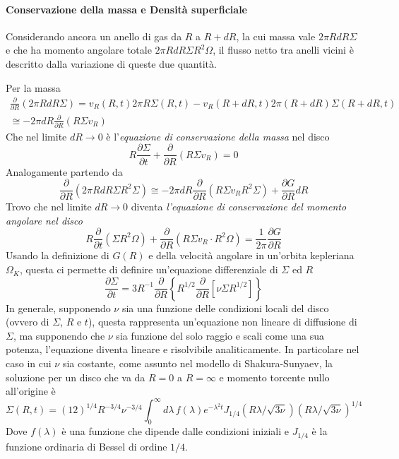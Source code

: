 \documentclass[a4paperbi]{article}
\begin{document}
	\paragraph{Conservazione della massa e Densità superficiale}
	Considerando ancora un anello di gas da $R$ a $R+dR$, la cui massa vale $2\pi RdR\Sigma$ e che ha momento angolare totale $2\pi RdR\Sigma R^2\Omega$, il flusso netto tra anelli vicini è descritto dalla variazione di queste due quantità. 
	
	Per la massa
	\begin{gather*}
		\frac{\partial}{\partial R}(2\pi RdR\Sigma)=v_R(R,t)2\pi R\Sigma(R,t)-v_R(R+dR,t)2\pi(R+dR)\Sigma(R+dR,t)\\
		\cong-2\pi dR\frac{\partial}{\partial R}(R\Sigma v_R)
	\end{gather*}
	Che nel limite $dR\rightarrow 0$ è l'\textit{equazione di conservazione della massa} nel disco
	\begin{equation}
		R\frac{\partial\Sigma}{\partial t}+\frac{\partial}{\partial R}(R\Sigma v_R)=0
	\end{equation}
	Analogamente partendo da
	\begin{equation*}
		\frac{\partial}{\partial R}(2\pi RdR\Sigma R^2\Sigma)\cong-2\pi dR\frac{\partial}{\partial R}(R\Sigma v_R R^2\Sigma)+\frac{\partial G}{\partial R}dR	
	\end{equation*}
	Trovo che nel limite $dR\rightarrow 0$ diventa \textit{l'equazione di conservazione del momento angolare nel disco}
	\begin{equation}
		R\frac{\partial}{\partial t}(\Sigma R^2\Omega)+\frac{\partial}{\partial R}(R\Sigma v_R\cdot R^2\Omega)=\frac{1}{2\pi}\frac{\partial G}{\partial R}
	\end{equation}
	Usando la definizione di $G(R)$ e della velocità angolare in un'orbita kepleriana $\Omega_K$,  questa ci permette di definire un'equazione differenziale di $\Sigma$ ed $R$
	\begin{equation}
		\frac{\partial\Sigma}{\partial t}=3R^{-1}\frac{\partial}{\partial R}\left\{R^{1/2}\frac{\partial}{\partial R}\left[\nu\Sigma R^{1/2}\right]\right\}
	\end{equation}
	In generale, supponendo $\nu$ sia una funzione delle condizioni locali del disco (ovvero di $\Sigma$, $R$ e $t$), questa rappresenta un'equazione non lineare di diffusione di $\Sigma$, ma supponendo che $\nu$ sia funzione del solo raggio e scali come una sua potenza, l'equazione diventa lineare e risolvibile analiticamente. In particolare nel caso in cui $\nu$ sia costante, come assunto nel modello di Shakura-Sunyaev, la soluzione per un disco che va da $R=0$ a $R=\infty$ e momento torcente nullo all'origine è
	\begin{equation}
		\Sigma(R,t)=(12)^{1/4}R^{-3/4}\nu^{-3/4}\int^{\infty}_0d\lambda\,f(\lambda)e^{-\lambda^2t}J_{1/4}(R\lambda/\sqrt{3\nu})(R\lambda/\sqrt{3\nu})^{1/4}
	\end{equation}
	Dove $f(\lambda)$ è una funzione che dipende dalle condizioni iniziali e $J_{1/4}$ è la funzione ordinaria di Bessel di ordine $1/4$.
	
\end{document}
